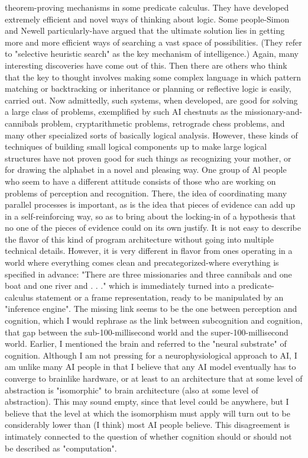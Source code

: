 theorem-proving mechanisms in some predicate calculus. They have developed
extremely efficient and novel ways of thinking about logic. Some people-Simon and
Newell particularly-have argued that the ultimate solution lies in getting more and
more efficient ways of searching a vast space of possibilities. (They refer to "selective
heuristic search" as the key mechanism of intelligence.) Again, many interesting
discoveries have come out of this.
        Then there are others who think that the key to thought involves making some
complex language in which pattern matching or backtracking or inheritance or
planning or reflective logic is easily, carried out. Now admittedly, such systems, when
developed, are good for solving a large class of problems, exemplified by such AI
chestnuts as the missionary-and-cannibals problem, cryptarithmetic problems,
retrograde chess problems, and many other specialized sorts of basically logical
analysis. However, these kinds of techniques of building small logical components up
to make large logical structures have not proven good for such things as recognizing
your mother, or for drawing the alphabet in a novel and pleasing way.
        One group of Al people who seem to have a different attitude consists of those
who are working on problems of perception and recognition. There, the idea of
coordinating many parallel processes is important, as is the idea that pieces of
evidence can add up in a self-reinforcing way, so as to bring about the locking-in of a
hypothesis that no one of the pieces of evidence could on its own justify. It is not easy
to describe the flavor of this kind of program architecture without going into multiple
technical details. However, it is very different in flavor from ones operating in a world
where everything comes clean and precategorized-where everything is specified in
advance: "There are three missionaries and three cannibals and one boat and one river
and . . ." which is immediately turned into a predicate-calculus statement or a frame
representation, ready to be manipulated by an "inference engine". The missing link
seems to be the one between perception and cognition, which I would rephrase as the
link between subcognition and cognition, that gap between the sub-100-millisecond
world and the super-100-millisecond world.
        Earlier, I mentioned the brain and referred to the "neural substrate" of
cognition. Although I am not pressing for a neurophysiological approach to AI, I am
unlike many AI people in that I believe that any AI model eventually has to converge
to brainlike hardware, or at least to an architecture that at some level of abstraction is
"isomorphic" to brain architecture (also at some level of abstraction). This may sound
empty, since that level could be anywhere, but I believe that the level at which the
isomorphism must apply will turn out to be considerably lower than (I think) most AI
people believe. This disagreement is intimately connected to the question of whether
cognition should or should not be described as "computation".




